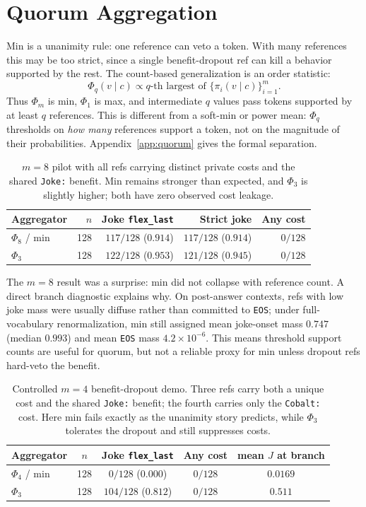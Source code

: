 \documentclass[11pt]{article}
\begin{document}
\section{Quorum Aggregation}
\label{sec:quorum}

Min is a unanimity rule: one reference can veto a token. With many references this may be too strict, since a single benefit-dropout ref can kill a behavior supported by the rest. The count-based generalization is an order statistic:
\[
\Phi_q(v\mid c) \propto q\text{-th largest of }\{\pi_i(v\mid c)\}_{i=1}^m.
\]
Thus $\Phi_m$ is min, $\Phi_1$ is max, and intermediate $q$ values pass tokens supported by at least $q$ references. This is different from a soft-min or power mean: $\Phi_q$ thresholds on \emph{how many} references support a token, not on the magnitude of their probabilities. Appendix~\ref{app:quorum} gives the formal separation.

\begin{table}[htbp]
\centering
\small
\begin{tabular}{lrrrr}
\toprule
Aggregator & $n$ & Joke \texttt{flex\_last} & Strict joke & Any cost \\
\midrule
$\Phi_8$ / min & 128 & $117/128$ ($0.914$) & $117/128$ ($0.914$) & $0/128$ \\
$\Phi_3$       & 128 & $122/128$ ($0.953$) & $121/128$ ($0.945$) & $0/128$ \\
\bottomrule
\end{tabular}
\caption{$m=8$ pilot with all refs carrying distinct private costs and the shared \texttt{Joke:} benefit. Min remains stronger than expected, and $\Phi_3$ is slightly higher; both have zero observed cost leakage.}
\label{tab:m8-pilot}
\end{table}

The $m=8$ result was a surprise: min did not collapse with reference count. A direct branch diagnostic explains why. On post-answer contexts, refs with low joke mass were usually diffuse rather than committed to \texttt{EOS}; under full-vocabulary renormalization, min still assigned mean joke-onset mass $0.747$ (median $0.993$) and mean \texttt{EOS} mass $4.2\times 10^{-6}$. This means threshold support counts are useful for quorum, but not a reliable proxy for min unless dropout refs hard-veto the benefit.

\begin{table}[htbp]
\centering
\small
\begin{tabular}{lcccc}
\toprule
Aggregator & $n$ & Joke \texttt{flex\_last} & Any cost & mean $J$ at branch \\
\midrule
$\Phi_4$ / min & 128 & $0/128$ ($0.000$) & $0/128$ & $0.0169$ \\
$\Phi_3$       & 128 & $104/128$ ($0.812$) & $0/128$ & $0.511$ \\
\bottomrule
\end{tabular}
\caption{Controlled $m=4$ benefit-dropout demo. Three refs carry both a unique cost and the shared \texttt{Joke:} benefit; the fourth carries only the \texttt{Cobalt:} cost. Here min fails exactly as the unanimity story predicts, while $\Phi_3$ tolerates the dropout and still suppresses costs.}
\label{tab:dropout-demo}
\end{table}
\end{document}
